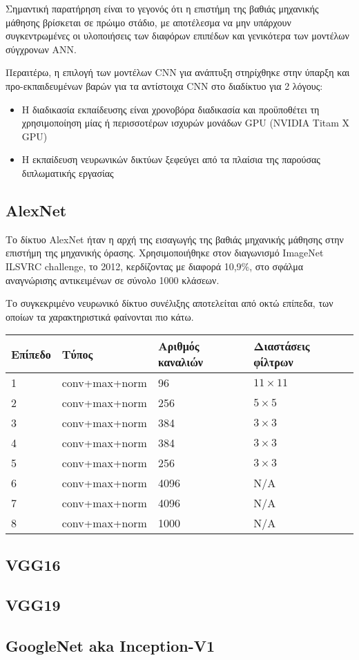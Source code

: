 Σημαντική παρατήρηση είναι το γεγονός ότι η επιστήμη της βαθιάς μηχανικής μάθησης
βρίσκεται σε πρώιμο στάδιο, με αποτέλεσμα να μην υπάρχουν συγκεντρωμένες
οι υλοποιήσεις των διαφόρων επιπέδων και γενικότερα των μοντέλων σύγχρονων ΑNN.

Περαιτέρω, η επιλογή των μοντέλων CNN για ανάπτυξη στηρίχθηκε στην ύπαρξη και
προ-εκπαιδευμένων βαρών για τα αντίστοιχα CNN στο διαδίκτυο για 2 λόγους:
\begin{itemize}
  \item{Η διαδικασία εκπαίδευσης είναι χρονοβόρα διαδικασία και προϋποθέτει
    τη χρησιμοποίηση μίας ή περισσοτέρων ισχυρών μονάδων GPU (NVIDIA Titam X GPU)}
  \item{Η εκπαίδευση νευρωνικών δικτύων ξεφεύγει από τα πλαίσια της παρούσας
    διπλωματικής εργασίας}
\end{itemize}


\subsection{AlexNet}

Το δίκτυο AlexNet ήταν η αρχή της εισαγωγής της βαθιάς
μηχανικής μάθησης στην επιστήμη της μηχανικής όρασης. Χρησιμοποιήθηκε
στον διαγωνισμό ImageNet ILSVRC challenge, το 2012, κερδίζοντας με διαφορά
10,9\%, στο σφάλμα αναγνώρισης αντικειμένων σε σύνολο 1000 κλάσεων.

Το συγκεκριμένο νευρωνικό δίκτυο συνέλιξης αποτελείται από οκτώ επίπεδα, των
οποίων τα χαρακτηριστικά φαίνονται πιο κάτω. \\

  \begin{tabular}{ | l | l | l | l | }
    \hline
    \rowcolor{Gray}
    Επίπεδο  & Τύπος & Αριθμός καναλιών & Διαστάσεις φίλτρων \\
    \hline
    1 & conv+max+norm & 96 & $11 \times 11$ \\
    2 & conv+max+norm & 256 & $5 \times 5$ \\
    3 & conv+max+norm & 384 & $3 \times 3$ \\
    4 & conv+max+norm & 384 & $3 \times 3$ \\
    5 & conv+max+norm & 256 & $3 \times 3$ \\
    6 & conv+max+norm & 4096 & Ν/A \\
    7 & conv+max+norm & 4096 & N/A \\
    8 & conv+max+norm & 1000 & N/A \\
    \hline
  \end{tabular}


\subsection{VGG16}

\subsection{VGG19}

\subsection{GoogleNet aka Inception-V1}
